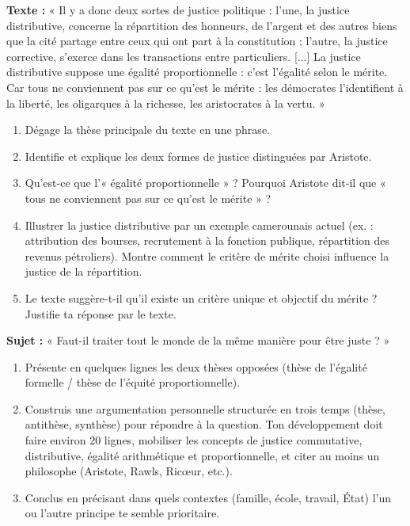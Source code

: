 \documentclass[11pt]{article}
\begin{document}
\begin{exercice}
\textbf{Texte :} « Il y a donc deux sortes de justice politique : l'une, la justice distributive, concerne la répartition des honneurs, de l'argent et des autres biens que la cité partage entre ceux qui ont part à la constitution ; l'autre, la justice corrective, s'exerce dans les transactions entre particuliers. [...] La justice distributive suppose une égalité proportionnelle : c'est l'égalité selon le mérite. Car tous ne conviennent pas sur ce qu'est le mérite : les démocrates l'identifient à la liberté, les oligarques à la richesse, les aristocrates à la vertu. »
\begin{enumerate}
\item Dégage la thèse principale du texte en une phrase.
\item Identifie et explique les deux formes de justice distinguées par Aristote.
\item Qu'est-ce que l'« égalité proportionnelle » ? Pourquoi Aristote dit-il que « tous ne conviennent pas sur ce qu'est le mérite » ?
\item Illustrer la justice distributive par un exemple camerounais actuel (ex. : attribution des bourses, recrutement à la fonction publique, répartition des revenus pétroliers). Montre comment le critère de mérite choisi influence la justice de la répartition.
\item Le texte suggère-t-il qu'il existe un critère unique et objectif du mérite ? Justifie ta réponse par le texte.
\end{enumerate}
\end{exercice}

\begin{exercice}
\textbf{Sujet :} « Faut-il traiter tout le monde de la même manière pour être juste ? »
\begin{enumerate}
\item Présente en quelques lignes les deux thèses opposées (thèse de l'égalité formelle / thèse de l'équité proportionnelle).
\item Construis une argumentation personnelle structurée en trois temps (thèse, antithèse, synthèse) pour répondre à la question. Ton développement doit faire environ 20 lignes, mobiliser les concepts de justice commutative, distributive, égalité arithmétique et proportionnelle, et citer au moins un philosophe (Aristote, Rawls, Ricœur, etc.).
\item Conclus en précisant dans quels contextes (famille, école, travail, État) l'un ou l'autre principe te semble prioritaire.
\end{enumerate}
\end{exercice}
\end{document}
